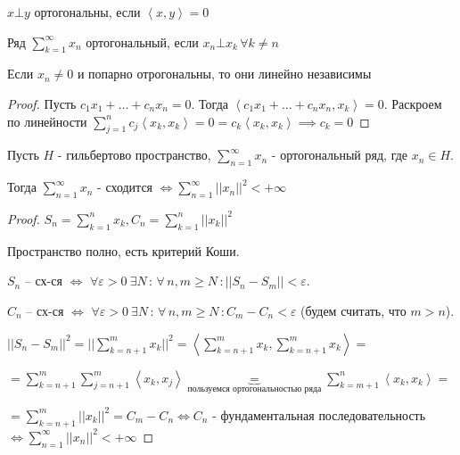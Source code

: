 \begin{definition}
    $x \bot y$ ортогональны, если $\left< x, y \right> = 0$
\end{definition}

\begin{definition}
    Ряд $\sum_{k=1}^{\infty} x_n$ ортогональный, если $x_n \bot x_k \, \forall k \neq n$
\end{definition}

\begin{remark}
    Если $x_n \neq 0$ и попарно отрогональны, то они линейно независимы

    \begin{proof}
        Пусть $c_1 x_1 + \ldots + c_n x_n = 0$. Тогда $\left < c_1 x_1 + \ldots + c_n x_n , x_k \right > = 0 $. Раскроем по линейности
        $\sum_{j = 1}^n c_j \left < x_k, x_k \right > = 0 = c_k \left < x_k, x_k \right > \implies c_k = 0$
    \end{proof}
\end{remark}

\begin{theorem}
    Пусть $H$ - гильбертово пространство, $\sum_{n = 1}^{\infty} x_n$ - ортогональный ряд, где $x_n \in H$.

    Тогда $\sum_{n = 1}^\infty x_n $ - сходится $\Longleftrightarrow \sum_{n = 1}^\infty || x_n ||^2 < +\infty$
\end{theorem}

\begin{proof}
    $S_n = \sum_{k = 1}^n x_k, C_n = \sum_{k = 1}^n ||x_k||^2$

    Пространство полно, есть критерий Коши.

    $S_n$ -- сх-ся $\Leftrightarrow$ $\forall \varepsilon > 0  \ \exists N \, : \, \forall \, n, m \geqslant N \, : ||S_n - S_m|| < \varepsilon$.

    $C_n$ -- сх-ся $\Leftrightarrow$ $\forall \varepsilon > 0 \ \exists N \, : \, \forall \, n, m \geqslant N \, : C_m - C_n < \varepsilon$ (будем считать, что $m > n$).

    \bigskip

    $||S_n - S_m||^2 = || \sum_{k = n + 1}^m x_k ||^2 = \left < \sum_{k = n + 1}^m x_k, \sum_{k = n + 1}^m x_k \right > =$
    
    $= \sum_{k=n+1}^{m} \sum_{j=n+1}^{m} \left< x_k, x_j \right> \underbrace{=}_{\text{пользуемся ортогональностью ряда}} \sum_{k = m + 1}^n \left < x_k , x_k \right > =$
    
    $= \sum_{k = n + 1}^m ||x_k||^2 = C_m - C_n \Longleftrightarrow C_n$ - фундаментальная последовательность $\Longleftrightarrow \sum_{n = 1}^\infty ||x_n||^2 < +\infty$
\end{proof}

